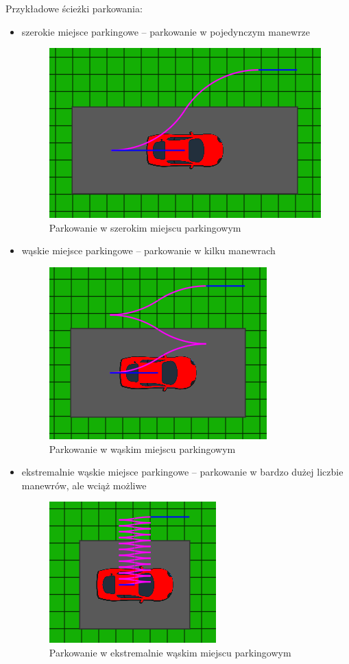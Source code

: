 \documentclass[a4paper,11pt,twoside]{report}
\theoremstyle{definition}
\begin{document}
Przykładowe ścieżki parkowania:
\begin{itemize}
	\item szerokie miejsce parkingowe – parkowanie w pojedynczym manewrze
	\begin{figure}[h!]
\centering
\includegraphics[scale=0.79]{parkingPathParallel1}
\caption[Parkowanie w szerokim miejscu parkingowym]{Parkowanie w szerokim miejscu parkingowym}
\end{figure}
	\item wąskie miejsce parkingowe – parkowanie w kilku manewrach
	\begin{figure}[h!]
\centering
\includegraphics[scale=0.8]{parkingPathParallel2}
\caption[Parkowanie w wąskim miejscu parkingowym]{Parkowanie w wąskim miejscu parkingowym}
\end{figure}
	\item ekstremalnie wąskie miejsce parkingowe – parkowanie w bardzo dużej liczbie manewrów, ale wciąż możliwe
	\begin{figure}[h!]
\centering
\includegraphics[scale=0.95]{parkingPathParallel3}
\caption[Parkowanie w ekstremalnie wąskim miejscu parkingowym]{Parkowanie w ekstremalnie wąskim miejscu parkingowym}
\end{figure}
\end{itemize}
\end{document}
